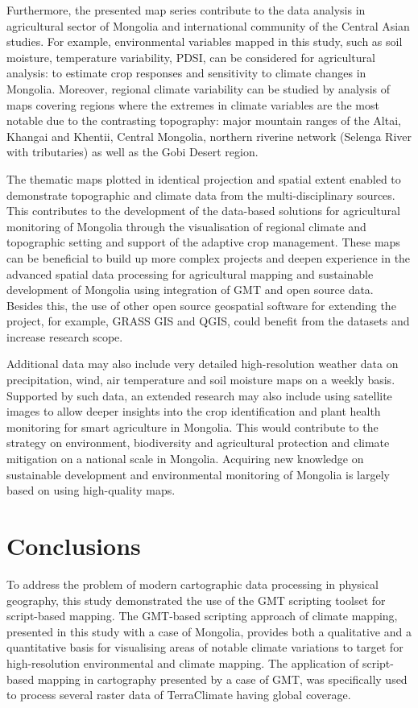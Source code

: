 \documentclass[geosciences,article,accept,pdftex,oneauthor]{Definitions/mdpi}
\begin{document}
Furthermore, the presented map series contribute to the data analysis in agricultural sector of Mongolia and international community of the Central Asian studies. For example, environmental variables mapped in this study, such as soil moisture, temperature variability, PDSI, can be considered for agricultural analysis: to estimate crop responses and sensitivity to climate changes in Mongolia. {Moreover, regional climate variability can be studied by analysis of maps covering regions where the extremes in climate variables are the most notable due to the contrasting topography: major mountain ranges of the Altai, Khangai and Khentii, Central Mongolia, northern riverine network (Selenga River with tributaries) as well as the Gobi Desert region.}

The thematic maps plotted in identical projection and spatial extent enabled to demonstrate topographic and climate data from the multi-disciplinary sources. This contributes to the development of the data-based solutions for agricultural monitoring of Mongolia through the visualisation of regional climate and topographic setting and support of the adaptive crop management. {These maps can be beneficial to build up more complex projects and deepen experience in the advanced spatial data processing for agricultural mapping and sustainable development of Mongolia using integration of GMT and open source data. Besides this, the use of other open source geospatial software for extending the project, for example, GRASS GIS and QGIS, could benefit from the datasets and increase research scope.}

Additional data may also include very detailed high-resolution weather data on precipitation, wind, air temperature and soil moisture maps on a weekly basis. Supported by such data, an extended research may also include using satellite images to allow deeper insights into the crop identification and plant health monitoring for smart agriculture in Mongolia. This would contribute to the strategy on environment, biodiversity and agricultural protection and climate mitigation on a national scale in Mongolia. Acquiring new knowledge on sustainable development and environmental monitoring of Mongolia is largely based on using high-quality maps.

\section{Conclusions}

To address the problem of modern cartographic data processing in physical geography, this study demonstrated the use of the GMT scripting toolset for script-based mapping. The GMT-based scripting approach of climate mapping, presented in this study with a case of Mongolia, provides both a qualitative and a quantitative basis for visualising areas of notable climate variations to target for high-resolution environmental and climate mapping. The application of script-based mapping in cartography presented by a case of GMT, was specifically used to process several raster data of TerraClimate having global coverage. 
\end{document}
